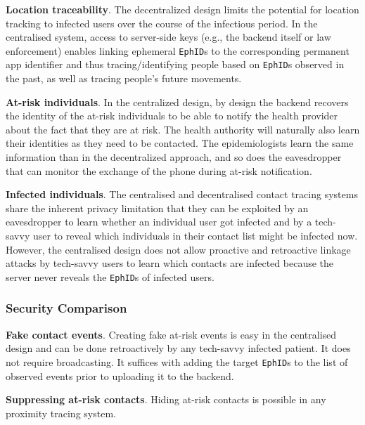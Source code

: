 \documentclass[10.8pt,a4paper]{article}
\begin{document}
\textbf{Location traceability}. The decentralized design limits the potential for location tracking to infected users over the course of the infectious period. In the centralised system, access to server-side keys (e.g., the backend itself or law enforcement) enables linking ephemeral \texttt{EphID}s to the corresponding permanent app identifier and thus tracing/identifying people based on \texttt{EphID}s  observed in the past, as well as tracing people’s future movements.

\textbf{At-risk individuals}. In the centralized design, by design the backend recovers the identity of the at-risk individuals to be able to notify the health provider about the fact that they are at risk. The health authority will naturally also learn their identities as they need to be contacted. The epidemiologists learn the same information than in the decentralized approach, and so does the eavesdropper that can monitor the exchange of the phone during at-risk notification.

\textbf{Infected individuals}. The centralised and decentralised contact tracing systems share the
inherent privacy limitation that they can be exploited by an eavesdropper to learn whether an individual user got infected and by a tech-savvy user to reveal which individuals in their contact list might be infected now. However, the centralised design does not allow proactive and retroactive linkage attacks by tech-savvy users to learn which contacts are infected because the server never reveals the \texttt{EphID}s of infected users.

\subsubsection{Security Comparison}
\textbf{Fake contact events}. Creating fake at-risk events is easy in the centralised design and can be done retroactively by any tech-savvy infected patient. It does not require broadcasting. It suffices with adding the target \texttt{EphID}s to the list of observed events prior to uploading it to the backend.

\textbf{Suppressing at-risk contacts}. Hiding at-risk contacts is possible in any proximity tracing system.
\end{document}
